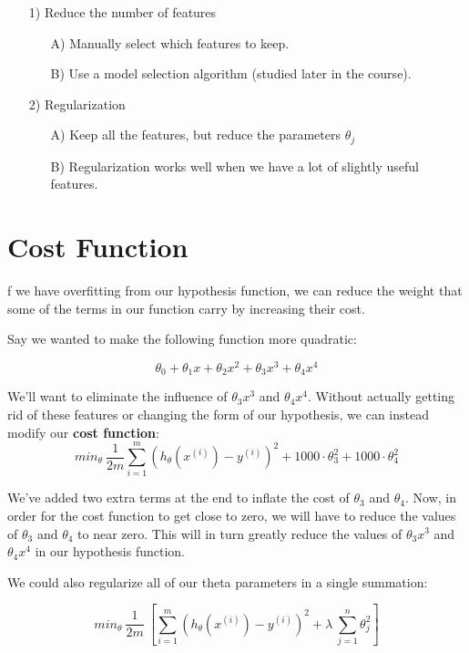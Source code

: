 \begin{itemize}
  \item[1)] Reduce the number of features
  \begin{itemize}
  	\item[A)] Manually select which features to keep. 
  	\item[B)] Use a model selection algorithm (studied later in the course).
  \end{itemize}
  \item[2)] Regularization
  \begin{itemize}
  	\item[A)] Keep all the features, but reduce the parameters $\theta_j$
  	\item[B)] Regularization works well when we have a lot of slightly useful features.
  \end{itemize}  
\end{itemize}

\section{Cost Function}
f we have overfitting from our hypothesis function, we can reduce the weight that some of the terms in our function carry by increasing their cost.

Say we wanted to make the following function more quadratic:

$$\theta_0 + \theta_1x + \theta_2x^2 + \theta_3x^3 + \theta_4x^4$$

We'll want to eliminate the influence of $\theta_3x^3$ and $\theta_4x^4$. Without actually getting rid of these features or changing the form of our hypothesis, we can instead modify our \textbf{cost function}:
\begin{equation}
min_\theta\ \dfrac{1}{2m}\sum_{i=1}^m (h_\theta(x^{(i)}) - y^{(i)})^2 + 1000\cdot\theta_3^2 + 1000\cdot\theta_4^2
\end{equation}

We've added two extra terms at the end to inflate the cost of $\theta_3$ and $\theta_4$. Now, in order for the cost function to get close to zero, we will have to reduce the values of $\theta_3$ and $\theta_4$ to near zero. This will in turn greatly reduce the values of $\theta_3x^3$ and $\theta_4x^4$ in our hypothesis function.

We could also regularize all of our theta parameters in a single summation:

\begin{equation}
min_\theta\ \dfrac{1}{2m}\ \left[ \sum_{i=1}^m (h_\theta(x^{(i)}) - y^{(i)})^2 + \lambda\ \sum_{j=1}^n \theta_j^2 \right]
\end{equation}

